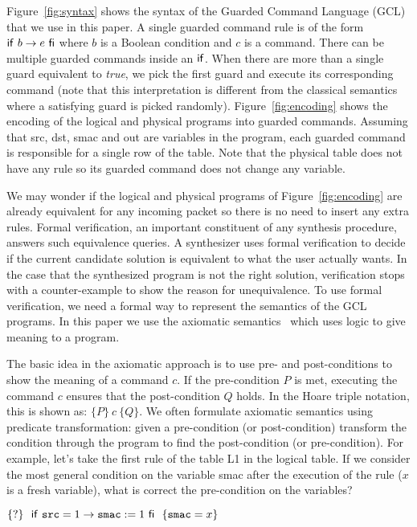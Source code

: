 Figure~\ref{fig:syntax} shows the syntax of the Guarded Command Language (GCL) 
that we use in this paper.
A single guarded command rule is of the form $\mathsf{if}~{b \to e}~\mathsf{fi}$ where $b$ is a Boolean
condition and $c$ is a command.
There can be multiple guarded commands inside an $\mathsf{if}$.
When there are more than a single guard equivalent to {\it true},
we pick the first guard and execute its corresponding command 
(note that this interpretation is different from the classical semantics where 
a satisfying guard is picked randomly).
Figure~\ref{fig:encoding} shows the encoding of the logical and physical programs into 
guarded commands.
Assuming that {\ttfamily src}, {\ttfamily dst}, {\ttfamily smac} and {\ttfamily out}
are variables in the program, each guarded command is responsible for a single row 
of the table.
Note that the physical table does not have any rule so its guarded command does not 
change any variable.

We may wonder if the logical and physical programs of Figure~\ref{fig:encoding}
are already equivalent for any incoming packet so there is no need to insert any extra rules.
Formal verification, an important constituent of any synthesis procedure, answers such equivalence queries.
A synthesizer uses formal verification to decide if the current candidate solution is equivalent 
to what the user actually wants.
In the case that the synthesized program is not the right solution, verification stops with a counter-example to show
the reason for unequivalence.
To use formal verification, we need a formal way to represent the semantics of the GCL programs.
In this paper we use the axiomatic semantics~\cite{hoare1969} which uses logic to give meaning to a program.

The basic idea in the axiomatic approach is to use pre- and post-conditions to show the 
meaning of a command $c$.
If the pre-condition $P$ is met, executing the command $c$ ensures that the post-condition $Q$ holds.
In the Hoare triple notation, this is shown as: $\{P\}~c~\{Q\}$.
We often formulate axiomatic semantics using predicate transformation: given a pre-condition (or post-condition)
transform the condition through the program to find the post-condition (or pre-condition).
For example, let's take the first rule of the table {\ttfamily L1} in the logical table.
If we consider the most general condition on the variable {\ttfamily smac} after the
execution of the rule ($x$ is a fresh variable), what is correct the pre-condition on the variables?

\begin{center}
$
\{?\} ~~ \mathsf{if}~{\mbox{\ttfamily src} = 1 \to \mbox{\ttfamily smac} := 1}~\mathsf{fi} ~~ \{\mbox{\ttfamily smac} = x\}
$ 
\end{center}


